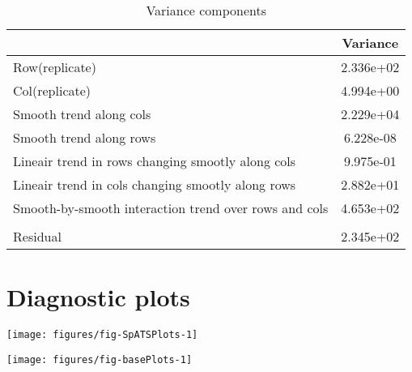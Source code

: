 \documentclass[a4paper,11pt]{article}\usepackage[]{graphicx}\usepackage[]{color}
\makeatletter
\def\maxwidth{ %
  \ifdim\Gin@nat@width>\linewidth
    \linewidth
  \else
    \Gin@nat@width
  \fi
}
\newenvironment{knitrout}{}{} %
\makeatother
\begin{document}
\begin{table}[ht]
\begin{flushleft}
\caption{Variance components} 
\label{varComps}
\begin{tabular}{lc}
  \hline
 & Variance \\ 
  \hline
Row(replicate) & 2.336e+02 \\ 
  Col(replicate) & 4.994e+00 \\ 
  Smooth trend along cols & 2.229e+04 \\ 
  Smooth trend along rows & 6.228e-08 \\ 
  Lineair trend in rows changing smootly along cols & 9.975e-01 \\ 
  Lineair trend in cols changing smootly along rows & 2.882e+01 \\ 
  Smooth-by-smooth interaction trend over rows and cols & 4.653e+02 \\ 
   &  \\ 
  Residual & 2.345e+02 \\ 
   \hline
\end{tabular}
\end{flushleft}
\end{table}

\clearpage

\section{Diagnostic plots}
\begin{knitrout}
\color{fgcolor}

{\centering \texttt{[image: figures/fig-SpATSPlots-1]} 

}



\end{knitrout}

\begin{knitrout}
\color{fgcolor}

{\centering \texttt{[image: figures/fig-basePlots-1]} 

}



\end{knitrout}
\newpage
\end{document}

